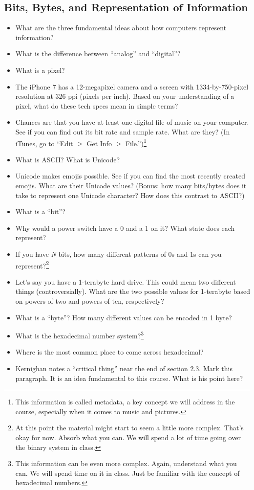 \documentclass[12pt]{article}
\begin{document}
\subsection*{Bits, Bytes, and Representation of Information}
\begin{itemize}
	\item What are the three fundamental ideas about how computers represent information?
	\item What is the difference between ``analog'' and ``digital''?
	\item What is a pixel?
	\item The iPhone 7 has a 12-megapixel camera and a screen with 1334-by-750-pixel resolution at 326 ppi (pixels per inch). Based on your understanding of a pixel, what do these tech specs mean in simple terms?
	\item Chances are that you have at least one digital file of music on your computer. See if you can find out its bit rate and sample rate. What are they? (In iTunes, go to ``Edit $>$ Get Info $>$ File.'')\footnote{This information is called metadata, a key concept we will address in the course, especially when it comes to music and pictures.}
	\item What is ASCII? What is Unicode?
	\item Unicode makes emojis possible. See if you can find the most recently created emojis. What are their Unicode values? (Bonus: how many bits/bytes does it take to represent one Unicode character? How does this contrast to ASCII?)
	\item What is a ``bit''?
	\item Why would a power switch have a 0 and a 1 on it? What state does each represent?
	\item If you have \textit{N} bits, how many different patterns of 0s and 1s can you represent?\footnote{At this point the material might start to seem a little more complex. That's okay for now. Absorb what you can. We will spend a lot of time going over the binary system in class.}
	\item Let's say you have a 1-terabyte hard drive. This could mean two different things (controversially). What are the two possible values for 1-terabyte based on powers of two and powers of ten, respectively?
	\item What is a ``byte''? How many different values can be encoded in 1 byte?
	\item What is the hexadecimal number system?\footnote{This information can be even more complex. Again, understand what you can. We will spend time on it in class. Just be familiar with the concept of hexadecimal numbers.}
	\item Where is the most common place to come across hexadecimal?
	\item Kernighan notes a ``critical thing'' near the end of section 2.3. Mark this paragraph. It is an idea fundamental to this course. What is his point here?
\end{itemize}
\end{document}
